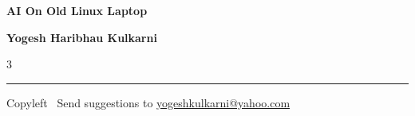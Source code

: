 \documentclass[8pt,landscape]{article}
\begin{document}
\footnotesize


\begin{center}
{\Large{\textbf{AI On Old Linux Laptop}}}  

\textbf{Yogesh Haribhau Kulkarni}
\end{center}

\begin{multicols}{3}

\end{multicols}

\rule{\linewidth}{0.25pt}
\scriptsize
Copyleft \textcopyleft\  Send suggestions to 
\href{http://www.yogeshkulkarni.com}{yogeshkulkarni@yahoo.com}
\end{document}
